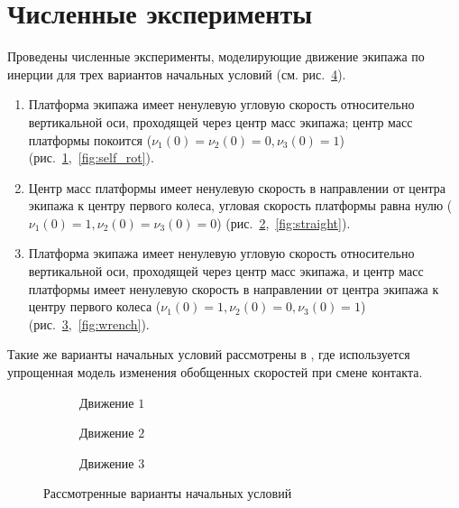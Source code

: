 
\section{Численные эксперименты}

Проведены численные эксперименты, моделирующие движение экипажа по инерции для трех вариантов начальных условий (см. рис.~\ref{fig:nu_impact}).
\begin{enumerate}[wide]
    \item \label{sol:self_rot} Платформа экипажа имеет ненулевую угловую скорость относительно вертикальной оси, проходящей через центр масс экипажа; центр масс платформы покоится ($\nu_1(0) = \nu_2(0) = 0, \nu_3(0) = 1$) (рис.~\ref{fig:nu_impact_1},~\ref{fig:self_rot}).
    \item \label{sol:straight} Центр масс платформы имеет ненулевую скорость в направлении от центра экипажа к центру первого колеса, угловая скорость платформы равна нулю ($\nu_1(0) = 1, \nu_2(0) = \nu_3(0) = 0$) (рис.~\ref{fig:nu_impact_2},~\ref{fig:straight}).
    \item \label{sol:wrench} Платформа экипажа имеет ненулевую угловую скорость относительно вертикальной оси, проходящей через центр масс экипажа, и центр масс платформы имеет ненулевую скорость в направлении от центра экипажа к центру первого колеса ($\nu_1(0) = 1, \nu_2(0) = 0, \nu_3(0) = 1$) (рис.~\ref{fig:nu_impact_3},~\ref{fig:wrench}).
\end{enumerate}
Такие же варианты начальных условий рассмотрены в \cite{GerasimovZobovaPMM2018}, где используется упрощенная модель изменения обобщенных скоростей при смене контакта.

\begin{figure}
    \centering
    \begin{subfigure}[t]{0.3\textwidth}
        \centering
        \caption{Движение $1$}
        \label{fig:nu_impact_1}
    \end{subfigure}
    \quad
    \begin{subfigure}[t]{0.3\textwidth}
        \centering
        \caption{Движение $2$}
        \label{fig:nu_impact_2}
    \end{subfigure}
    \quad
    \begin{subfigure}[t]{0.3\textwidth}
        \centering
        \caption{Движение $3$}
        \label{fig:nu_impact_3}
    \end{subfigure}
    \caption{Рассмотренные варианты начальных условий}
    \label{fig:nu_impact}
\end{figure}
    
